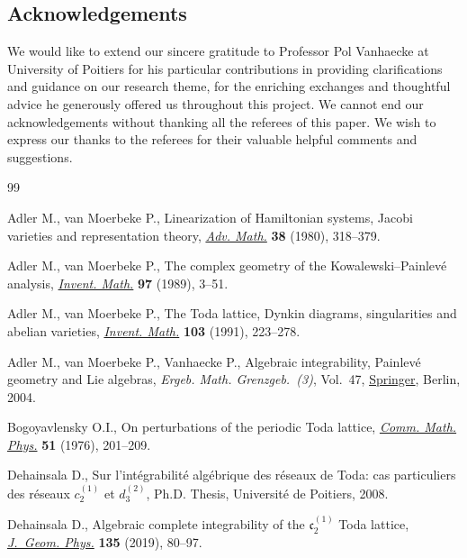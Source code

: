 \documentclass[pdftex]{sigma}
\numberwithin{equation}{section}
\begin{document}
\subsection*{Acknowledgements}
We would like to extend our sincere gratitude to Professor Pol
Vanhaecke at University of Poitiers for his particular contributions
in providing clarifications and guidance on our research theme, for
the enriching exchanges and thoughtful advice he generously offered
us throughout this project. We cannot end our acknowledgements
without thanking all the referees of this paper. We wish to express
our thanks to the referees for their valuable helpful comments and
suggestions.

\begin{thebibliography}{99}
\footnotesize\itemsep=0pt


Adler M., van Moerbeke P., Linearization of {H}amiltonian systems, {J}acobi
 varieties and representation theory, \href{https://doi.org/10.1016/0001-8708(80)90008-0}{\textit{Adv. Math.}} \textbf{38} (1980),
 318--379.

Adler M., van Moerbeke P., The complex geometry of the
 {K}owalewski--{P}ainlev\'e analysis, \href{https://doi.org/10.1007/BF01850654}{\textit{Invent. Math.}} \textbf{97}
 (1989), 3--51.

Adler M., van Moerbeke P., The {T}oda lattice, {D}ynkin diagrams, singularities
 and abelian varieties, \href{https://doi.org/10.1007/BF01239513}{\textit{Invent. Math.}} \textbf{103} (1991), 223--278.

Adler M., van Moerbeke P., Vanhaecke P., Algebraic integrability, {P}ainlev\'e
 geometry and {L}ie algebras, \textit{Ergeb. Math. Grenzgeb.~(3)}, Vol.~47,
 \href{https://doi.org/10.1007/978-3-662-05650-9}{Springer}, Berlin, 2004.

Bogoyavlensky O.I., On perturbations of the periodic {T}oda lattice,
 \href{https://doi.org/10.1007/BF01617919}{\textit{Comm. Math. Phys.}} \textbf{51} (1976), 201--209.

Dehainsala D., Sur l'int\'egrabilit\'e alg\'ebrique des r\'eseaux de {T}oda:
 cas particuliers des r\'eseaux $c_2^{(1)}$ et $d_3^{(2)}$, Ph.D. Thesis,
 {U}niversit\'e de Poitiers, 2008.

Dehainsala D., Algebraic complete integrability of the {$\mathfrak c_2^{(1)}$}
 {T}oda lattice, \href{https://doi.org/10.1016/j.geomphys.2018.09.008}{\textit{J.~Geom. Phys.}} \textbf{135} (2019), 80--97.


\end{thebibliography}
\end{document}
